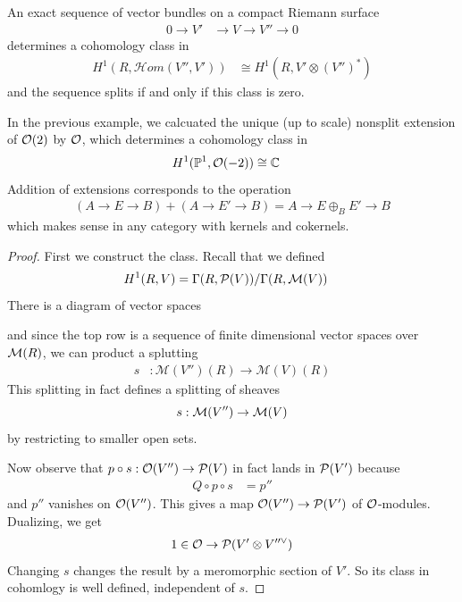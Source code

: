 \documentclass[12pt]{article}
\begin{document}
\begin{theorem}
An exact sequence of vector bundles on a compact Riemann surface
\begin{align*}
    0 \to V' & \to V \to V'' \to 0
\end{align*} determines a cohomology class in
\begin{align*}
     H^1(R, \mathcal{H}om(V'', V')) & \cong H^1(R, V' \otimes (V'')^*)
    \end{align*} and the sequence splits if and only if this class is zero.
\end{theorem}
\begin{example}
    In the previous example, we calcuated the unique (up to scale) nonsplit extension of ${\mathcal{O}}(2)$ by ${\mathcal{O}}$, which determines a cohomology class in \begin{align*}
        H^1(\mathbb{P}^1, {\mathcal{O}}(-2)) & \cong \mathbb{C}
    \end{align*}
    Addition of extensions corresponds to the operation \begin{align*}
        (A \to E \to B) + (A \to E' \to B) = A \to E \oplus_B E' \to B
    \end{align*} which makes sense in any category with kernels and cokernels. 
\end{example}

\begin{proof}
First we construct the class. Recall that we defined \begin{align*}
    H^1(R, V) & = \Gamma(R, {\mathcal{P}}(V)) / \Gamma(R, {\mathcal{M}}(V))
\end{align*} There is a diagram of vector spaces 
\begin{center}
\end{center}
and since the top row is a sequence of finite dimensional vector spaces over ${\mathcal{M}}(R)$, we can product a splutting \begin{align*}
    s & : \mathcal{M}(V'')(R) \to \mathcal{M}(V)(R)
\end{align*} This splitting in fact defines a splitting of sheaves \[s:{\mathcal{M}}(V'') \to {\mathcal{M}}(V)\] by restricting to smaller open sets. 

Now observe that $p\circ s:{\mathcal{O}}(V'') \to {\mathcal{P}}(V)$ in fact lands in ${\mathcal{P}}(V')$ because \begin{align*}
    Q \circ p \circ s & = p'' 
\end{align*} and $p''$ vanishes on ${\mathcal{O}}(V'')$. This gives a map ${\mathcal{O}}(V'') \to {\mathcal{P}}(V')$ of ${\mathcal{O}}$-modules. Dualizing, we get \begin{align*}
    1 \in {\mathcal{O}} \to {\mathcal{P}}(V' \otimes V''^\vee)
\end{align*}
Changing $s$ changes the result by a meromorphic section of $V'$. So its class in cohomlogy is well defined, independent of $s$.
\end{proof}
\end{document}

